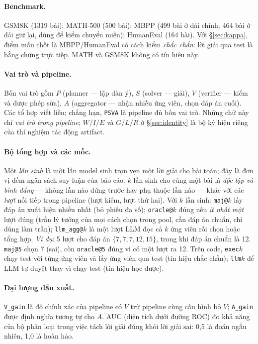 \documentclass[11pt,a4paper]{article}
\begin{document}
\paragraph{Benchmark.} GSM8K \cite{cobbe2021} (1319 bài); MATH-500 \cite{hendrycks2021}
(500 bài); MBPP \cite{austin2021} (499 bài ở dải chính; 464 bài ở dải giữ lại, dùng để kiểm
chuyển miền); HumanEval \cite{chen2021} (164 bài). Với \S\ref{sec:kappa}, điểm mấu chốt là
MBPP/HumanEval có cách kiểm \emph{chắc chắn}: lời giải qua test là bằng chứng trực tiếp. MATH
và GSM8K không có tín hiệu này.

\paragraph{Vai trò và pipeline.} Bốn vai trò gồm $P$ (planner --- lập dàn ý), $S$ (solver --- giải),
$V$ (verifier --- kiểm và được phép sửa), $A$ (aggregator --- nhận nhiều ứng viên, chọn đáp án
cuối). Các tổ hợp viết liền; chẳng hạn, \texttt{PSVA} là pipeline đủ bốn vai trò. Những chữ này chỉ
\emph{vai trò trong pipeline}; $W/I/E$ và $G/L/R$ ở \S\ref{sec:identity} là bộ ký hiệu riêng của
thí nghiệm tác động artifact.

\paragraph{Bộ tổng hợp và các mốc.} Một \emph{lần sinh} là một lần model sinh trọn vẹn một lời
giải cho bài toán; đây là đơn vị đếm ngân sách suy luận của báo cáo. $k$ lần sinh cho cùng một bài
là \emph{độc lập và bình đẳng} --- không lần nào đứng trước hay phụ thuộc lần nào --- khác với các
\emph{lượt} nối tiếp trong pipeline (lượt kiểm, lượt thứ hai). Với $k$ lần sinh:
\texttt{maj@}$k$ lấy đáp án xuất hiện nhiều nhất (bỏ phiếu đa số);
\texttt{oracle@}$k$ đúng nếu \emph{ít nhất một} lượt đúng (trần lý tưởng của mọi cách chọn
trong pool, cần đáp án chuẩn, chỉ dùng làm trần);
\texttt{llm\_agg@}$k$ là một lượt LLM đọc cả $k$ ứng viên rồi chọn hoặc tổng hợp.
\emph{Ví dụ}: 5 lượt cho đáp án $\{7, 7, 7, 12, 15\}$, trong khi đáp án chuẩn là 12.
\texttt{maj@5} chọn 7 (sai), còn \texttt{oracle@5} đúng vì có một lượt ra 12. Trên code,
\texttt{exec}$k$ chạy test với từng ứng viên và lấy ứng viên qua test (tín hiệu chắc chắn);
\texttt{llm}$k$ để LLM tự duyệt thay vì chạy test (tín hiệu học được).

\paragraph{Đại lượng dẫn xuất.} \texttt{V\_gain} là độ chính xác của pipeline có $V$ trừ
pipeline cùng cấu hình bỏ $V$; \texttt{A\_gain} được định nghĩa tương tự cho $A$. AUC (diện
tích dưới đường ROC) đo khả năng của bộ phân loại trong việc tách lời giải đúng khỏi lời giải
sai: 0,5 là đoán ngẫu nhiên, 1,0 là hoàn hảo.
\end{document}
